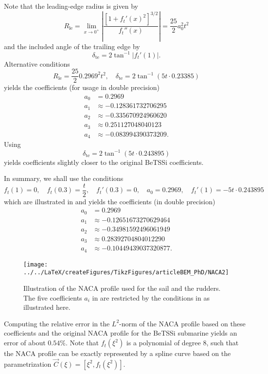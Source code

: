 Note that the leading-edge radius is given by
\begin{equation*}
	R_{\mathrm{le}} =\lim_{x\to 0^+} \left|\frac{\left[1+f_t'(x)^2\right]^{3/2}}{f_t''(x)}\right| =  \frac{25}{2}a_0^2t^2
\end{equation*}
and the included angle of the trailing edge by
\begin{equation*}
	\delta_{\mathrm{te}} = 2\tan^{-1}|f_t'(1)|.
\end{equation*}
Alternative conditions \cite{Cummings2015gfa}
\begin{equation}\label{Eq3:NACAconditions2}
	R_{\mathrm{le}} = \frac{25}{2}0.2969^2t^2,\quad \delta_{\mathrm{te}} = 2\tan^{-1}(5t\cdot 0.23385)
\end{equation}
yields the coefficients (for usage in double precision)
\begin{align*}
	a_0 &= 0.2969\\
	a_1 &\approx-0.128361732706295\\
	a_2 &\approx-0.335670924960620\\
	a_3 &\approx 0.251127048040123\\
	a_4 &\approx-0.083994390373209.
\end{align*}
Using
\begin{equation*}
	\delta_{\mathrm{te}} = 2\tan^{-1}(5t\cdot 0.243895)
\end{equation*}
yields coefficients slightly closer to the original BeTSSi coefficients.

In summary, we shall use the conditions
\begin{equation}\label{Eq3:NACAconditions3}
	f_t(1) = 0,\quad  f_t(0.3) = \frac{t}{2}, \quad f_t'(0.3) = 0,\quad a_0 = 0.2969,\quad f_t'(1) = -5 t\cdot 0.243895
\end{equation}
which are illustrated in  and yields the coefficients (in double precision)
\begin{align*}
	a_0 &= 0.2969\\
	a_1 &\approx-0.12651673270629464\\
	a_2 &\approx-0.34981592496061949\\
	a_3 &\approx 0.28392704804012290\\
	a_4 &\approx-0.10449439037320877.
\end{align*}

\begin{figure}
	\centering
	\texttt{[image: ../../LaTeX/createFigures/TikzFigures/articleBEM\_PhD/NACA2]}
	\caption{Illustration of the NACA profile used for the sail and the rudders. The five coefficients $a_i$ in  are restricted by the conditions in  as illustrated here.}
	\label{Fig3:NACA2}
\end{figure}
Computing the relative error in the $L^2$-norm of the NACA profile based on these coefficients and the original NACA profile for the BeTSSi submarine yields an error of about $0.54\%$. Note that $f_t(\xi^2)$ is a polynomial of degree 8, such that the NACA profile can be exactly represented by a spline curve based on the parametrization $\vec{C}(\xi) = [\xi^2,f_t(\xi^2)]$. 

